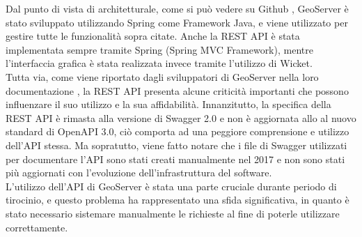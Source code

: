 Dal punto di vista di architetturale, come si può vedere su Github \cite{GithubGeoServer}, GeoServer è stato sviluppato utilizzando Spring come Framework Java, e viene utilizzato per gestire tutte le funzionalità sopra citate. Anche la REST API è stata implementata sempre tramite Spring (Spring MVC Framework), mentre l'interfaccia grafica è stata realizzata invece tramite l'utilizzo di Wicket.
\\Tutta via, come viene riportato dagli sviluppatori di GeoServer nella loro documentazione \cite{DocumentazioneGeoServer}, la REST API presenta alcune criticità importanti che possono influenzare il suo utilizzo e la sua affidabilità.
Innanzitutto, la specifica della REST API è rimasta alla versione di Swagger 2.0 e non è aggiornata allo al nuovo standard di OpenAPI 3.0, ciò comporta ad una peggiore comprensione e utilizzo dell'API stessa.
Ma sopratutto, viene fatto notare che i file di Swagger utilizzati per documentare l'API sono stati creati manualmente nel 2017 e non sono stati più aggiornati con l'evoluzione dell'infrastruttura del software.
\\L'utilizzo dell'API di GeoServer è stata una parte cruciale durante periodo di tirocinio, e questo problema ha rappresentato una sfida significativa, in quanto è stato necessario sistemare manualmente le richieste al fine di poterle utilizzare correttamente.
